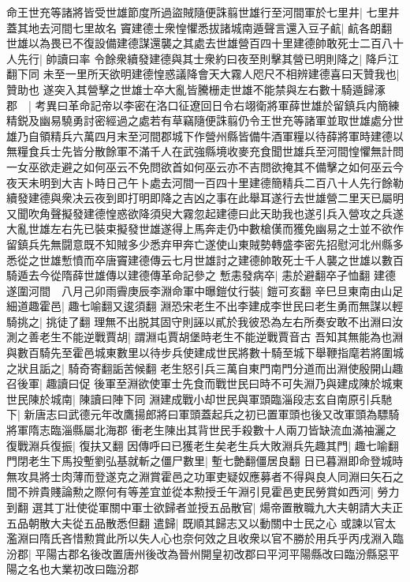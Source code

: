 命王世充等諸將皆受世雄節度所過盜賊隨便誅翦世雄行至河間軍於七里井|{
	七里井蓋其地去河間七里故名}
竇建德士衆惶懼悉拔諸城南遁聲言還入豆子䴚|{
	䴚各朗翻}
世雄以為畏已不復設備建德謀還襲之其處去世雄營百四十里建德帥敢死士二百八十人先行|{
	帥讀曰率}
令餘衆續發建德與其士衆約曰夜至則擊其營已明則降之|{
	降戶江翻下同}
未至一里所天欲明建德惶惑議降會天大霧人咫尺不相辨建德喜曰天贊我也|{
	贊助也}
遂突入其營擊之世雄士卒大亂皆騰栅走世雄不能禁與左右數十騎遁歸涿郡　|{
	考異曰革命記帝以李密在洛口征遼回日令右翊衛將軍薛世雄於留鎮兵内簡練精鋭及幽易驍勇討密經過之處若有草竊隨便誅翦仍令王世充等諸軍並取世雄處分世雄乃自領精兵六萬四月末至河間郡城下作營州縣皆備牛酒軍糧以待薛將軍時建德以無糧食兵士先皆分散餘軍不滿千人在武強縣境收麥充食聞世雄兵至河間惶懼無計問一女巫欲走避之如何巫云不免問欲首如何巫云亦不吉問欲掩其不備擊之如何巫云今夜天未明到大吉卜時日己午卜處去河間一百四十里建德簡精兵二百八十人先行餘勒續發建德與衆决云夜到即打明即降之吉凶之事在此舉耳遂行去世雄營二里天已屬明又聞吹角聲擬發建德惶惑欲降須臾大霧忽起建德曰此天助我也遂引兵入營攻之兵遂大亂世雄左右先已裝束擬發世雄遂得上馬奔走仍中數槍傼而獲免幽易之士並不欲作留鎮兵先無闘意既不知賊多少悉弃甲奔亡遂使山東賊勢轉盛李密先招慰河北州縣多悉從之世雄慙憤而卒唐竇建德傳云七月世雄討之建德帥敢死士千人襲之世雄以數百騎遁去今從隋薛世雄傳以建德傳革命記參之}
慙恚發病卒|{
	恚於避翻卒子恤翻}
建德遂圍河間　八月己卯雨霽庚辰李淵命軍中曝鎧仗行裝|{
	鎧可亥翻}
辛巳旦東南由山足細道趣霍邑|{
	趣七喻翻又逡須翻}
淵恐宋老生不出李建成李世民曰老生勇而無謀以輕騎挑之|{
	挑徒了翻}
理無不出脱其固守則誣以貳於我彼恐為左右所奏安敢不出淵曰汝測之善老生不能逆戰賈胡|{
	謂淵屯賈胡堡時老生不能逆戰賈音古}
吾知其無能為也淵與數百騎先至霍邑城東數里以待步兵使建成世民將數十騎至城下舉鞭指麾若將圍城之狀且詬之|{
	騎奇寄翻詬苦候翻}
老生怒引兵三萬自東門南門分道而出淵使殷開山趣召後軍|{
	趣讀曰促}
後軍至淵欲使軍士先食而戰世民曰時不可失淵乃與建成陳於城東世民陳於城南|{
	陳讀曰陣下同}
淵建成戰小却世民與軍頭臨淄段志玄自南原引兵馳下|{
	新唐志曰武德元年改鷹揚郎將曰軍頭蓋起兵之初已置軍頭也後又改軍頭為驃騎將軍隋志臨淄縣屬北海郡}
衝老生陳出其背世民手殺數十人兩刀皆缺流血滿袖灑之復戰淵兵復振|{
	復扶又翻}
因傳呼曰已獲老生矣老生兵大敗淵兵先趣其門|{
	趣七喻翻}
門閉老生下馬投塹劉弘基就斬之僵尸數里|{
	塹七艶翻僵居良翻}
日已暮淵即命登城時無攻具將士肉薄而登遂克之淵賞霍邑之功軍吏疑奴應募者不得與良人同淵曰矢石之間不辨貴賤論勲之際何有等差宜並從本勲授壬午淵引見霍邑吏民勞賞如西河|{
	勞力到翻}
選其丁壯使從軍關中軍士欲歸者並授五品散官|{
	煬帝置散職九大夫朝請大夫正五品朝散大夫從五品散悉但翻}
遣歸|{
	既順其歸志又以動關中士民之心}
或諫以官太濫淵曰隋氏吝惜勲賞此所以失人心也奈何效之且收衆以官不勝於用兵乎丙戌淵入臨汾郡|{
	平陽古郡名後改置唐州後改為晉州開皇初改郡曰平河平陽縣改曰臨汾縣惡平陽之名也大業初改曰臨汾郡}
